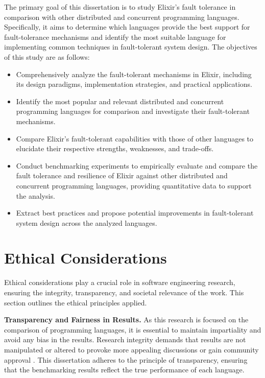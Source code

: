 The primary goal of this dissertation is to study Elixir’s fault tolerance in comparison with other distributed and concurrent programming languages. Specifically, it aims to determine which languages provide the best support for fault-tolerance mechanisms and identify the most suitable language for implementing common techniques in fault-tolerant system design. The objectives of this study are as follows:

\begin{itemize}
    \item Comprehensively analyze the fault-tolerant mechanisms in Elixir, including its design paradigms, implementation strategies, and practical applications.
    \item Identify the most popular and relevant distributed and concurrent programming languages for comparison and investigate their fault-tolerant mechanisms.
    \item Compare Elixir’s fault-tolerant capabilities with those of other languages to elucidate their respective strengths, weaknesses, and trade-offs.
    \item Conduct benchmarking experiments to empirically evaluate and compare the fault tolerance and resilience of Elixir against other distributed and concurrent programming languages, providing quantitative data to support the analysis.
    \item Extract best practices and propose potential improvements in fault-tolerant system design across the analyzed languages.
\end{itemize}

\section{Ethical Considerations}

Ethical considerations play a crucial role in software engineering research, ensuring the integrity, transparency, and societal relevance of the work. This section outlines the ethical principles applied.

\textbf{Transparency and Fairness in Results.} As this research is focused on the comparison of programming languages, it is essential to maintain impartiality and avoid any bias in the results. Research integrity demands that results are not manipulated or altered to provoke more appealing discussions or gain community approval \cite{EthicDeb2018}. This dissertation adheres to the principle of transparency, ensuring that the benchmarking results reflect the true performance of each language.

